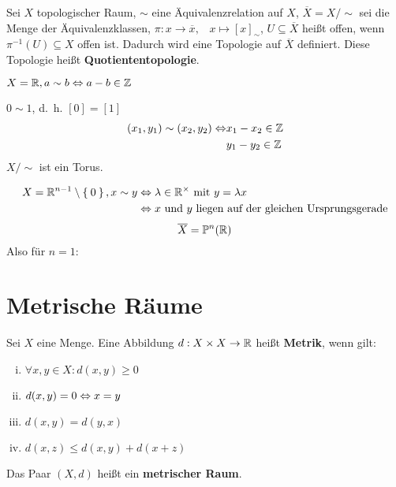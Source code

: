 \begin{definition} 
    Sei $X$ topologischer Raum, $\sim$ eine Äquivalenzrelation auf $X$,
    $\overline{X} = X /  \sim$ sei die Menge der Äquivalenzklassen,
    $\pi: x \rightarrow \overline{x}, \;\;\; x \mapsto [x]_\sim$,
    $U \subseteq \overline{X}$ heißt offen, wenn $\pi^{-1} (U) \subseteq X$
    offen ist. Dadurch wird eine Topologie auf $\overline{X}$ definiert.
    Diese Topologie heißt \textbf{Quotiententopologie}.
\end{definition}

\begin{beispiel}
    $X = \mathbb{R}, a \sim b \Leftrightarrow a-b \in \mathbb{Z}$
    
    

    $0 \sim 1$, d.~h. $[0] = [1]$
    \begin{align*}
        (x_1, y_1) \sim (x_2, y_2) \Leftrightarrow &x_1 - x_2 \in \mathbb{Z}\\
                                                   &y_1 - y_2 \in \mathbb{Z}
    \end{align*}
    $X / \sim$ ist ein Torus.
\end{beispiel}

\begin{beispiel}
    \begin{align*}
        X= \mathbb{R}^{n-1} \setminus \Set{0}, x \sim y &\Leftrightarrow \lambda \in \mathbb{R}^\times \text{ mit } y = \lambda x\\
            &\Leftrightarrow x \text{ und } y \text{ liegen auf der gleichen Ursprungsgerade}
    \end{align*}
    \[\overline{X} = \mathbb{P}^n(\mathbb{R})\]
    Also für $n=1$:

    
\end{beispiel}

\section{Metrische Räume}
\begin{definition}  
    Sei $X$ eine Menge. Eine Abbildung $d:X\times X \rightarrow \mathbb{R}$
    heißt \textbf{Metrik}, wenn gilt:
    \begin{enumerate}[(i)]
        \item $\forall x, y \in X: d(x,y) \geq 0$
        \item $d(x,y) = 0 \Leftrightarrow x = y$
        \item $d(x,y) = d(y,x)$
        \item $d(x,z) \leq d(x,y) + d(x+z)$
    \end{enumerate}

    Das Paar $(X, d)$ heißt ein \textbf{metrischer Raum}.
\end{definition}

